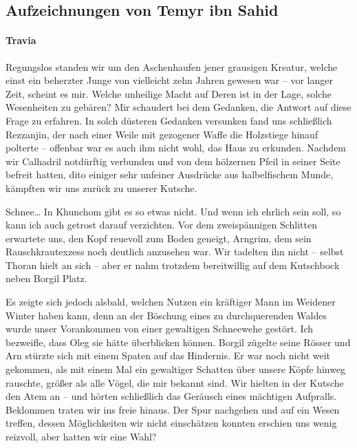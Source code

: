 \subsection{Aufzeichnungen von Temyr ibn Sahid}

\paragraph{Travia}
Regungslos standen wir um den Aschenhaufen jener grausigen Kreatur, welche einst ein beherzter Junge von vielleicht zehn Jahren gewesen war -- vor langer Zeit, scheint es mir. Welche unheilige Macht auf Deren ist in der Lage, solche Wesenheiten zu gebären? Mir schaudert bei dem Gedanken, die Antwort auf diese Frage zu erfahren. In solch düsteren Gedanken versunken fand uns schließlich Rezzanjin, der nach einer Weile mit gezogener Waffe die Holzstiege hinauf polterte -- offenbar war es auch ihm nicht wohl, das Haus zu erkunden. Nachdem wir Calhadril notdürftig verbunden und von dem hölzernen Pfeil in seiner Seite befreit hatten, dito einiger sehr unfeiner Ausdrücke aus halbelfischem Munde, kämpften wir uns zurück zu unserer Kutsche. \par

Schnee… In Khunchom gibt es so etwas nicht. Und wenn ich ehrlich sein soll, so kann ich auch getrost darauf verzichten. Vor dem zweispännigen Schlitten erwartete uns, den Kopf reuevoll zum Boden geneigt, Arngrim, dem sein Rauschkrautexzess noch deutlich anzusehen war. Wir tadelten ihn nicht -- selbst Thoran hielt an sich -- aber er nahm trotzdem bereitwillig auf dem Kutschbock neben Borgil Platz. \par

Es zeigte sich jedoch alsbald, welchen Nutzen ein kräftiger Mann im Weidener Winter haben kann, denn an der Böschung eines zu durchquerenden Waldes wurde unser Vorankommen von einer gewaltigen Schneewehe gestört. Ich bezweifle, dass Oleg sie hätte überblicken können. Borgil zügelte seine Rösser und Arn stürzte sich mit einem Spaten auf das Hindernis. Er war noch nicht weit gekommen, als mit einem Mal ein gewaltiger Schatten über unsere Köpfe hinweg rauschte, größer als alle Vögel, die mir bekannt sind. Wir hielten in der Kutsche den Atem an -- und hörten schließlich das Geräusch eines mächtigen Aufpralls. Beklommen traten wir ins freie hinaus. Der Spur nachgehen und auf ein Wesen treffen, dessen Möglichkeiten wir nicht einschätzen konnten erschien uns wenig reizvoll, aber hatten wir eine Wahl?\par

